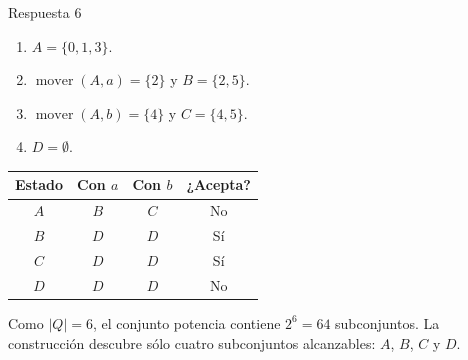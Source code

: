 \documentclass[11pt,spanish]{article}
\begin{document}
\ifrespuestas
\begin{respuesta}{Respuesta 6}
\begin{enumerate}[leftmargin=*]
    \item \(A=\{0,1,3\}\).
    \item \(\operatorname{mover}(A,a)=\{2\}\) y \(B=\{2,5\}\).
    \item \(\operatorname{mover}(A,b)=\{4\}\) y \(C=\{4,5\}\).
    \item \(D=\emptyset\).
\end{enumerate}

\begin{center}
\small
\begin{tabular}{|c|c|c|c|}
\hline
\textbf{Estado} & \textbf{Con \(a\)} & \textbf{Con \(b\)} & \textbf{¿Acepta?} \tabularnewline
\hline
\(A\) & \(B\) & \(C\) & No \tabularnewline
\hline
\(B\) & \(D\) & \(D\) & Sí \tabularnewline
\hline
\(C\) & \(D\) & \(D\) & Sí \tabularnewline
\hline
\(D\) & \(D\) & \(D\) & No \tabularnewline
\hline
\end{tabular}
\end{center}

Como \(|Q|=6\), el conjunto potencia contiene \(2^6=64\) subconjuntos. La construcción descubre sólo cuatro subconjuntos alcanzables: \(A\), \(B\), \(C\) y \(D\).
\end{respuesta}
\fi
\end{document}
